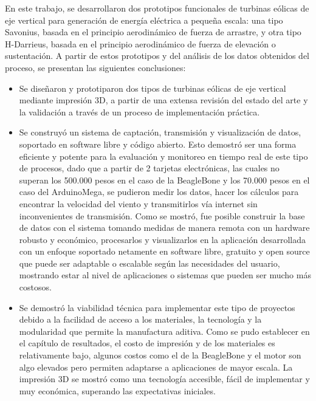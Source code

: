\documentclass[letterpaper,12pt, oneside]{book}
\begin{document}
En este trabajo, se desarrollaron dos prototipos funcionales de turbinas eólicas de eje vertical para generación de energía eléctrica a pequeña escala: una tipo Savonius, basada en el principio aerodinámico de fuerza de arrastre, y otra tipo H-Darrieus, basada en el principio aerodinámico de fuerza de elevación o sustentación. A partir de estos prototipos y del análisis de los datos obtenidos del proceso, se presentan las siguientes conclusiones: 

\begin{itemize}
   \item Se diseñaron y prototiparon dos tipos de turbinas eólicas de eje vertical mediante impresión 3D, a partir de una extensa revisión del estado del arte y la validación a través de un proceso de implementación práctica.
   
   \item Se construyó un sistema de captación, transmisión y visualización de datos, soportado en software libre y código abierto. Esto demostró ser una forma eficiente y potente para la evaluación y monitoreo en tiempo real de este tipo de procesos, dado que a partir de 2 tarjetas electrónicas, las cuales no superan los 500.000 pesos en el caso de la BeagleBone y los 70.000 pesos en el caso del ArduinoMega, se pudieron medir los datos, hacer los cálculos para encontrar la velocidad del viento y transmitirlos vía internet sin inconvenientes de transmisión. Como se mostró, fue posible construir la base de datos con el sistema tomando medidas de manera remota con un hardware robusto y económico, procesarlos y visualizarlos en la aplicación desarrollada con un enfoque soportado netamente en software libre, gratuito y open source que puede ser adaptable o escalable según las necesidades del usuario, mostrando estar al nivel de aplicaciones o sistemas que pueden ser mucho más costosos.
      
   \item Se demostró la viabilidad técnica para implementar este tipo de proyectos debido a la facilidad de acceso a los materiales, la tecnología y la modularidad que permite la manufactura aditiva. Como se pudo establecer en el capítulo de resultados, el costo de impresión y de los materiales es relativamente bajo, algunos costos como el de la BeagleBone y el motor son algo elevados pero permiten adaptarse a aplicaciones de mayor escala. La impresión 3D se mostró como una tecnología accesible, fácil de implementar y muy económica, superando las expectativas iniciales.
   

\end{itemize}
\end{document}
